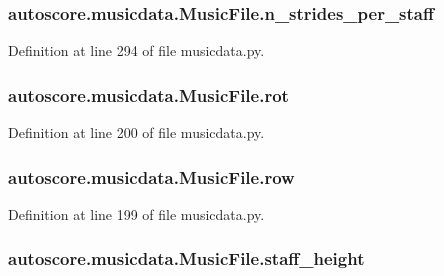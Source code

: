 \subsubsection[{\texorpdfstring{n\+\_\+strides\+\_\+per\+\_\+staff}{n_strides_per_staff}}]{\setlength{\rightskip}{0pt plus 5cm}autoscore.\+musicdata.\+Music\+File.\+n\+\_\+strides\+\_\+per\+\_\+staff}\hypertarget{classautoscore_1_1musicdata_1_1MusicFile_a95cfa2e1ee100a067205888ff6fb9eab}{}\label{classautoscore_1_1musicdata_1_1MusicFile_a95cfa2e1ee100a067205888ff6fb9eab}


Definition at line 294 of file musicdata.\+py.

\subsubsection[{\texorpdfstring{rot}{rot}}]{\setlength{\rightskip}{0pt plus 5cm}autoscore.\+musicdata.\+Music\+File.\+rot}\hypertarget{classautoscore_1_1musicdata_1_1MusicFile_aa6280fb328ef92537f3669b09eeaa454}{}\label{classautoscore_1_1musicdata_1_1MusicFile_aa6280fb328ef92537f3669b09eeaa454}


Definition at line 200 of file musicdata.\+py.

\subsubsection[{\texorpdfstring{row}{row}}]{\setlength{\rightskip}{0pt plus 5cm}autoscore.\+musicdata.\+Music\+File.\+row}\hypertarget{classautoscore_1_1musicdata_1_1MusicFile_a5a1d870c90397fcc18b659df3a24caba}{}\label{classautoscore_1_1musicdata_1_1MusicFile_a5a1d870c90397fcc18b659df3a24caba}


Definition at line 199 of file musicdata.\+py.

\subsubsection[{\texorpdfstring{staff\+\_\+height}{staff_height}}]{\setlength{\rightskip}{0pt plus 5cm}autoscore.\+musicdata.\+Music\+File.\+staff\+\_\+height}\hypertarget{classautoscore_1_1musicdata_1_1MusicFile_a9730a491a3fbb499b523abab1a78eff2}{}\label{classautoscore_1_1musicdata_1_1MusicFile_a9730a491a3fbb499b523abab1a78eff2}



